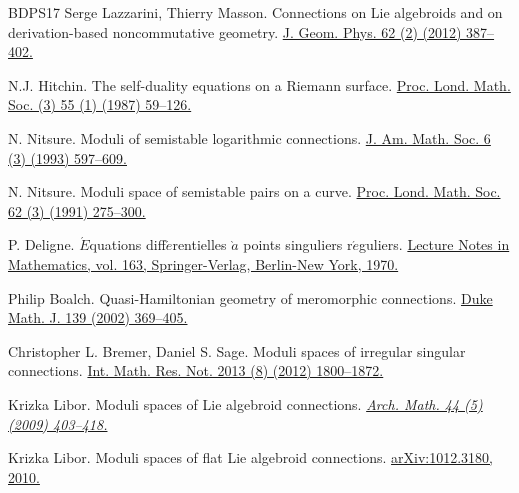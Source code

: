 \documentclass[12pt,reqno]{amsart}
\numberwithin{equation}{subsection}
\theoremstyle{definition}
\theoremstyle{theorem}
\begin{document}
\begin{thebibliography}{BDPS17}
	\newblock Serge Lazzarini, Thierry Masson.
	\newblock Connections on Lie algebroids and on derivation-based noncommutative geometry.
	\newblock  \href{https://www.sciencedirect.com/science/article/pii/S0393044011002506}{J. Geom. Phys. 62 (2) (2012)
	387–402.}
	
	\newblock N.J. Hitchin.
	\newblock The self-duality equations on a Riemann surface.
	\newblock \href{https://londmathsoc.onlinelibrary.wiley.com/doi/abs/10.1112/plms/s3-55.1.59}{Proc. Lond. Math. Soc. (3) 55 (1) (1987) 59–126.}
	
	\newblock N. Nitsure.
	\newblock  Moduli of semistable logarithmic connections.
	\newblock \href{https://www.scopus.com/pages/publications/84968466784}{J. Am. Math. Soc. 6 (3) (1993) 597–609.}
	
	
	\newblock N. Nitsure.
	\newblock Moduli space of semistable pairs on a curve.
	\newblock  \href{https://londmathsoc.onlinelibrary.wiley.com/doi/abs/10.1112/plms/s3-62.2.275}{Proc. Lond. Math. Soc. 62 (3) (1991) 275–300.}
	
	
	\newblock  P. Deligne.
	\newblock $\acute{E}$quations diff$\acute{e}$rentielles $\grave{a}$ points singuliers r$\acute{e}$guliers.
	\newblock \href{http://dx.doi.org/10.1007/BFb0061194}{Lecture Notes in Mathematics, vol. 163, Springer-Verlag, Berlin-New York, 1970.}
	
	
	
	\newblock Philip Boalch.
	\newblock Quasi-Hamiltonian geometry of meromorphic connections.
	\newblock \href{https://doi.org/10.1215/S0012-7094-07-13924-3}{Duke Math. J. 139 (2002) 369–405.}
	
	\newblock Christopher L. Bremer, Daniel S. Sage.
	\newblock Moduli spaces of irregular singular connections.
	\newblock \href{https://doi.org/10.1093/imrn/rns103}{Int. Math. Res. Not. 2013 (8) (2012) 1800–1872.}

	\newblock Krizka Libor.
	\newblock Moduli spaces of Lie algebroid connections.
	\newblock \href{https://eudml.org/doc/250509}{\em Arch. Math. 44 (5) (2009) 403–418.}
	
	\newblock Krizka Libor.
	\newblock Moduli spaces of flat Lie algebroid connections.
	\newblock \href{http://eudml.org/doc/250509}{arXiv:1012.3180, 2010.}
	

\end{thebibliography}
\end{document}
